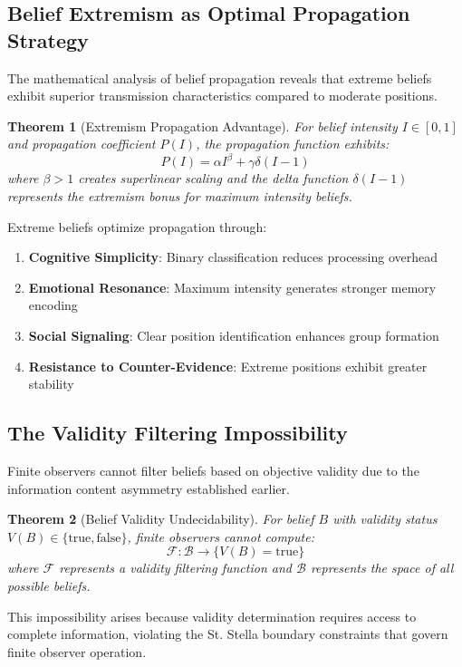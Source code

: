 \documentclass[12pt,a4paper]{article}
\newtheorem{theorem}{Theorem}
\begin{document}
\subsection{Belief Extremism as Optimal Propagation Strategy}

The mathematical analysis of belief propagation reveals that extreme beliefs exhibit superior transmission characteristics compared to moderate positions.

\begin{theorem}[Extremism Propagation Advantage]
For belief intensity $I \in [0,1]$ and propagation coefficient $P(I)$, the propagation function exhibits:
$$P(I) = \alpha I^{\beta} + \gamma \delta(I-1)$$
where $\beta > 1$ creates superlinear scaling and the delta function $\delta(I-1)$ represents the extremism bonus for maximum intensity beliefs.
\end{theorem}

Extreme beliefs optimize propagation through:
\begin{enumerate}
\item \textbf{Cognitive Simplicity}: Binary classification reduces processing overhead
\item \textbf{Emotional Resonance}: Maximum intensity generates stronger memory encoding
\item \textbf{Social Signaling}: Clear position identification enhances group formation
\item \textbf{Resistance to Counter-Evidence}: Extreme positions exhibit greater stability
\end{enumerate}

\subsection{The Validity Filtering Impossibility}

Finite observers cannot filter beliefs based on objective validity due to the information content asymmetry established earlier.

\begin{theorem}[Belief Validity Undecidability]
For belief $B$ with validity status $V(B) \in \{\text{true}, \text{false}\}$, finite observers cannot compute:
$$\mathcal{F}: \mathcal{B} \rightarrow \{V(B) = \text{true}\}$$
where $\mathcal{F}$ represents a validity filtering function and $\mathcal{B}$ represents the space of all possible beliefs.
\end{theorem}

This impossibility arises because validity determination requires access to complete information, violating the St. Stella boundary constraints that govern finite observer operation.
\end{document}
